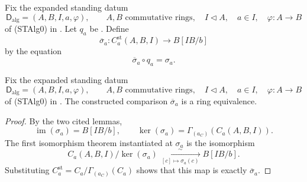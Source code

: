 \begin{definition}
  \label{def:nagata-strict-transform-chart-comparison}
  \lean{}

  Fix the expanded standing datum
  \[
    \mathsf D_{\mathrm{alg}}=(A,B,I,a,\varphi),\qquad
    A,B\text{ commutative rings},\quad
    I\triangleleft A,\quad a\in I,\quad
    \varphi\colon A\to B
  \]
  of (STAlg0) in
  .
  Let $q_a$ be .  Define
  \[
    \overline\sigma_a\colon
      C_a^{\mathrm{st}}(A,B,I)\longrightarrow B[IB/b]
  \]
  by the equation
  \[
    \overline\sigma_a\circ q_a=\sigma_a.
  \]
\end{definition}

\begin{proposition}
  \label{prop:nagata-strict-transform-chart-iso}
  \lean{}

  Fix the expanded standing datum
  \[
    \mathsf D_{\mathrm{alg}}=(A,B,I,a,\varphi),\qquad
    A,B\text{ commutative rings},\quad
    I\triangleleft A,\quad a\in I,\quad
    \varphi\colon A\to B
  \]
  of (STAlg0) in
  .
  The constructed comparison $\overline\sigma_a$ is a ring equivalence.
\end{proposition}

\begin{proof}
  By the two cited lemmas,
  \[
    \operatorname{im}(\sigma_a)=B[IB/b],\qquad
    \ker(\sigma_a)=\Gamma_{(a_C)}(C_a(A,B,I)).
  \]
  The first isomorphism theorem instantiated at $\sigma_a$ is the
  isomorphism
  \[
    C_a(A,B,I)/\ker(\sigma_a)
      \xrightarrow[\ [c]\mapsto\sigma_a(c)\ ]{\sim}B[IB/b].
  \]
  Substituting
  $C_a^{\mathrm{st}}=C_a/\Gamma_{(a_C)}(C_a)$ shows that this map is exactly
  $\overline\sigma_a$.
\end{proof}

